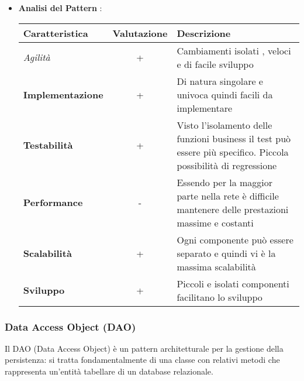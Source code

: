 {{{\begin{itemize}
					Sorgono i problemi della distribuzione e della disponibilità dei sistemi remoti. Non si può utilizzare nel caso abbiamo bisogno di un orchestratore, a meno che non rimanga all'interno di un microservizio, e nemmeno nel caso abbiamo bisogno di transazionalità.
					\item \textbf{Analisi del Pattern} :
					\small %
					{\renewcommand\arraystretch{1.2} %
						\begin{tabular}{|l|c|l|}
							\hline
							{\textbf{Caratteristica}}&{\textbf{Valutazione}}&{\textbf{Descrizione}}\\
							\hline
							\textit{Agilità} & + & Cambiamenti isolati , veloci e di facile sviluppo \\
							\hline
							\textbf{Implementazione} & + & Di natura singolare e univoca quindi facili da implementare \\
							\hline
							\textbf{Testabilità} & + & Visto l'isolamento delle funzioni business il test può essere più specifico. Piccola possibilità di regressione \\
							\hline
							\textbf{Performance} & - & Essendo per la maggior parte nella rete è difficile mantenere delle prestazioni massime e costanti \\
							\hline
							\textbf{Scalabilità} & + & Ogni componente può essere separato e quindi vi è la massima scalabilità \\
							\hline
							\textbf{Sviluppo} & + & Piccoli e isolati componenti facilitano lo sviluppo \\
							\hline
						\end{tabular}
					}
				\end{itemize}
		}
		\subsubsection{Data Access Object (DAO)}{
			Il DAO (Data Access Object) è un pattern architetturale per la gestione della persistenza: si tratta fondamentalmente di una classe con relativi metodi che rappresenta un'entità tabellare di un database relazionale.
			
}}}
